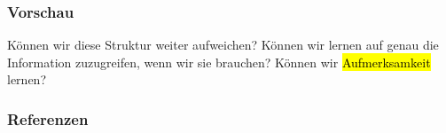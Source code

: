 \documentclass[german,aspectratio=169]{beamer}
\begin{document}
\begin{frame}
	\frametitle{Vorschau}
	Können wir diese Struktur weiter aufweichen? Können wir lernen auf genau die Information zuzugreifen, wenn wir sie brauchen? Können wir \hl{Aufmerksamkeit} lernen?
\end{frame}

%	


\begin{frame}[allowframebreaks]
	\frametitle{Referenzen}
	{\scriptsize%
		
		}
\end{frame}
\end{document}
